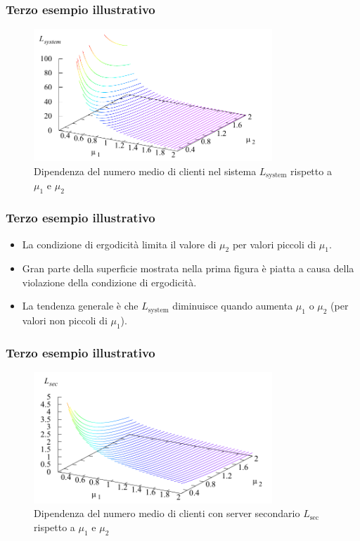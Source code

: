 \documentclass{beamer}
\begin{document}
\begin{frame}
    \frametitle{Terzo esempio illustrativo}
    \begin{figure}[h]
        \centering
        \includegraphics[width=0.8\textwidth]{CBOSr9C.png}
        \caption{Dipendenza del numero medio di clienti nel sistema $L_{\mathrm{system}}$ rispetto a $\mu_1$ e $\mu_2$}
    \end{figure}
\end{frame}


\begin{frame}
    \frametitle{Terzo esempio illustrativo}
    \begin{itemize}
        \item La condizione di ergodicità limita il valore di $\mu_2$ per valori piccoli di $\mu_1$.
        \item Gran parte della superficie mostrata nella prima figura è piatta a causa della violazione della condizione di ergodicità.
        \item La tendenza generale è che $L_{\text{system}}$ diminuisce quando aumenta $\mu_1$ o $\mu_2$ (per valori non piccoli di $\mu_1$).
    \end{itemize}
\end{frame}


\begin{frame}
    \frametitle{Terzo esempio illustrativo}
    \begin{figure}[h]
        \centering
        \includegraphics[width=0.8\textwidth]{R1VGHAR.png}
        \caption{Dipendenza del numero medio di clienti con server secondario $L_{\mathrm{sec}}$ rispetto a $\mu_1$ e $\mu_2$}
    \end{figure}
\end{frame}
\end{document}
